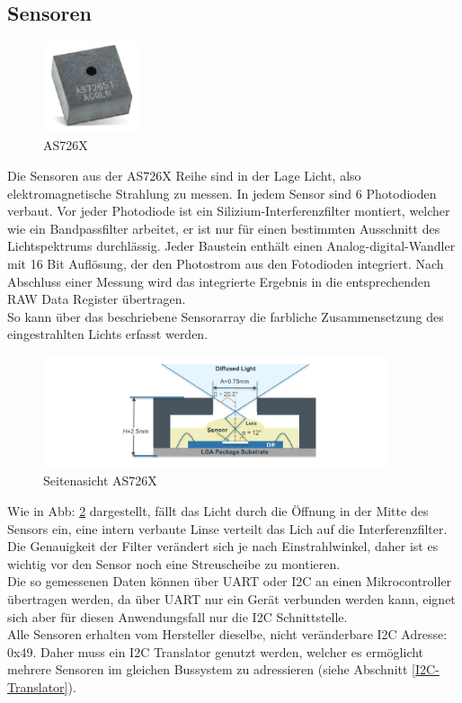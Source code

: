 \subsection{Sensoren}\label{Sensoren}

\begin{figure}
\centering
\includegraphics[width=0.25\textwidth]{img/as726X.png}
 \caption{AS726X \cite{Datenblatt_AS7265X}}
\label{fig:AS726X}
\end{figure}

Die Sensoren aus der AS726X Reihe sind in der Lage Licht, also elektromagnetische Strahlung zu messen. 
In jedem Sensor sind 6 Photodioden verbaut. 
Vor jeder Photodiode ist ein Silizium-Interferenzfilter montiert, welcher wie ein Bandpassfilter arbeitet, er ist nur für einen bestimmten Ausschnitt des Lichtspektrums durchlässig.
Jeder Baustein enthält einen Analog-digital-Wandler mit 16 Bit Auflösung, der den Photostrom aus den Fotodioden integriert. Nach Abschluss einer Messung wird das integrierte Ergebnis in die entsprechenden RAW Data Register übertragen.\\
So kann über das beschriebene Sensorarray die farbliche Zusammensetzung des eingestrahlten Lichts erfasst werden.

\begin{figure}[H]
\centering
\includegraphics[width=0.9\textwidth]{img/AS726X-seitenansicht.png}
\caption{Seitenasicht AS726X\cite{Datenblatt_AS7265X}}
\label{fig:Seitenasicht-AS726X}
\end{figure}

\noindent Wie in Abb: \ref{fig:Seitenasicht-AS726X} dargestellt, fällt das Licht durch die Öffnung in der Mitte des Sensors ein, eine intern verbaute Linse verteilt das Lich auf die Interferenzfilter. Die Genauigkeit der Filter verändert sich je nach Einstrahlwinkel, daher ist es wichtig vor den Sensor noch eine Streuscheibe zu montieren.\\
Die so gemessenen Daten können über UART oder I2C an einen Mikrocontroller übertragen werden, da über UART nur ein Gerät verbunden werden kann, eignet sich aber für diesen Anwendungsfall nur die I2C Schnittstelle.\\
Alle Sensoren erhalten vom Hersteller dieselbe, nicht veränderbare I2C Adresse: 0x49. Daher muss ein I2C Translator genutzt werden, welcher es ermöglicht mehrere Sensoren im gleichen Bussystem zu adressieren (siehe Abschnitt \ref{I2C-Translator}).\\


